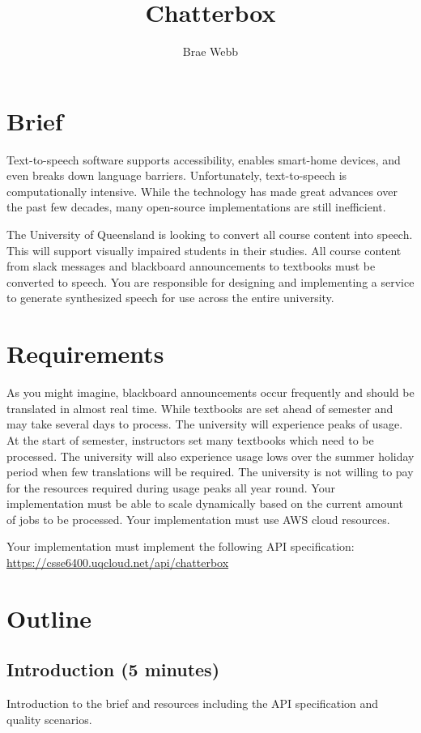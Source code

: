 \documentclass{csse4400}
\title{Chatterbox}
\author{Brae Webb}
\date{\week[tutorial]{10}}
\begin{document}
\maketitle

\section{Brief}

Text-to-speech software supports accessibility,
enables smart-home devices,
and even breaks down language barriers.
Unfortunately, text-to-speech is computationally intensive.
While the technology has made great advances over the past few decades,
many open-source implementations are still inefficient.

The University of Queensland is looking to convert all course content into speech.
This will support visually impaired students in their studies.
All course content from slack messages and blackboard announcements to textbooks must be converted to speech.
You are responsible for designing and implementing a service to generate synthesized speech for use across the entire university.


\section{Requirements}

As you might imagine,
blackboard announcements occur frequently and should be translated in almost real time.
While textbooks are set ahead of semester and may take several days to process.
The university will experience peaks of usage.
At the start of semester,
instructors set many textbooks which need to be processed.
The university will also experience usage lows over the summer holiday period when few translations will be required.
The university is not willing to pay for the resources required during usage peaks all year round.
Your implementation must be able to scale dynamically based on the current amount of jobs to be processed.
Your implementation must use AWS cloud resources.

Your implementation must implement the following API specification:\\
\url{https://csse6400.uqcloud.net/api/chatterbox}

\section{Outline}

\subsection*{Introduction (5 minutes)}
Introduction to the brief
and resources including the API specification and quality scenarios.
\end{document}
